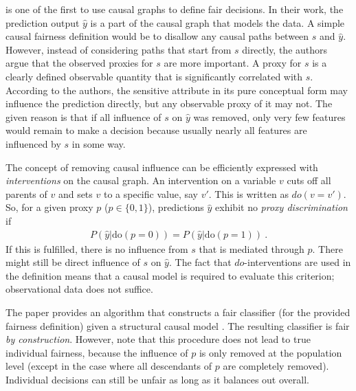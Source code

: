 
\citet{kilbertus2017avoiding} is one of the first to use causal graphs to define fair decisions.
In their work, the prediction output \(\hat{y}\) is a part of the causal graph that models the data.
A simple causal fairness definition would be to disallow any causal paths between \(s\) and \(\hat{y}\).
However, instead of considering paths that start from \(s\) directly,
the authors argue that the observed proxies for \(s\) are more important.
A proxy for \(s\) is a clearly defined observable quantity
that is significantly correlated with \(s\).
According to the authors,
the sensitive attribute in its pure conceptual form may influence the prediction directly,
but any observable proxy of it may not.
The given reason is that if all influence of \(s\) on \(\hat{y}\) was removed,
only very few features would remain to make a decision
because usually nearly all features are influenced by \(s\) in some way.

The concept of removing causal influence
can be efficiently expressed with \emph{interventions} on the causal graph.
An intervention on a variable \(v\) cuts off all parents of \(v\)
and sets \(v\) to a specific value, say \(v'\).
This is written as \(do(v=v')\).
So, for a given proxy \(p\) (\(p \in \{0, 1\}\)),
predictions \(\hat{y}\) exhibit no \emph{proxy discrimination} if
\begin{align}
  \label{eq:proxy-discrimination}
  P(\hat{y} | \text{do}(p=0)) = P(\hat{y}|\text{do}(p=1))~.
\end{align}
If this is fulfilled, there is no influence from \(s\) that is mediated through \(p\).
There might still be direct influence of \(s\) on \(\hat{y}\).
The fact that \(do\)-interventions are used in the definition means
that a causal model is required to evaluate this criterion; observational data does not suffice.

The paper provides an algorithm that constructs a fair classifier (for the provided fairness definition)
given a structural causal model \citep{pearl2009causality}.
The resulting classifier is fair \emph{by construction}.
However, note that this procedure does not lead to true individual fairness,
because the influence of \(p\) is only removed at the population level
(except in the case where all descendants of \(p\) are completely removed).
Individual decisions can still be unfair as long as it balances out overall.

